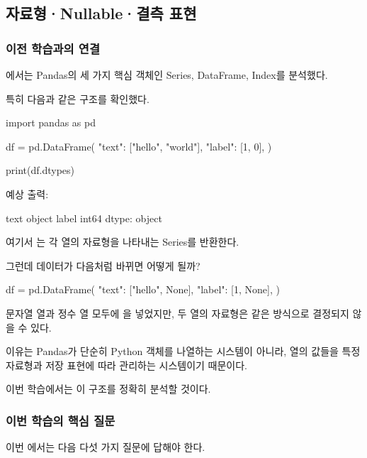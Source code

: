 

\subsection{자료형·Nullable·결측 표현}

\subsubsection{이전 학습과의 연결}

에서는 Pandas의 세 가지 핵심 객체인 Series, DataFrame, Index를 분석했다.

특히 다음과 같은 구조를 확인했다.

\begin{dhkcode}
import pandas as pd

df = pd.DataFrame({
    "text": ["hello", "world"],
    "label": [1, 0],
})

print(df.dtypes)
\end{dhkcode}

예상 출력:

\begin{dhkzsh}
text     object
label     int64
dtype: object
\end{dhkzsh}

여기서 는 각 열의 자료형을 나타내는 Series를 반환한다.

그런데 데이터가 다음처럼 바뀌면 어떻게 될까?

\begin{dhkcode}
df = pd.DataFrame({
    "text": ["hello", None],
    "label": [1, None],
})
\end{dhkcode}

문자열 열과 정수 열 모두에 을 넣었지만, 두 열의 자료형은 같은 방식으로 결정되지 않을 수 있다.

이유는 Pandas가 단순히 Python 객체를 나열하는 시스템이 아니라, 열의 값들을 특정 자료형과 저장 표현에 따라 관리하는 시스템이기 때문이다.

이번 학습에서는 이 구조를 정확히 분석할 것이다.

\subsubsection{이번 학습의 핵심 질문}

이번 에서는 다음 다섯 가지 질문에 답해야 한다.


